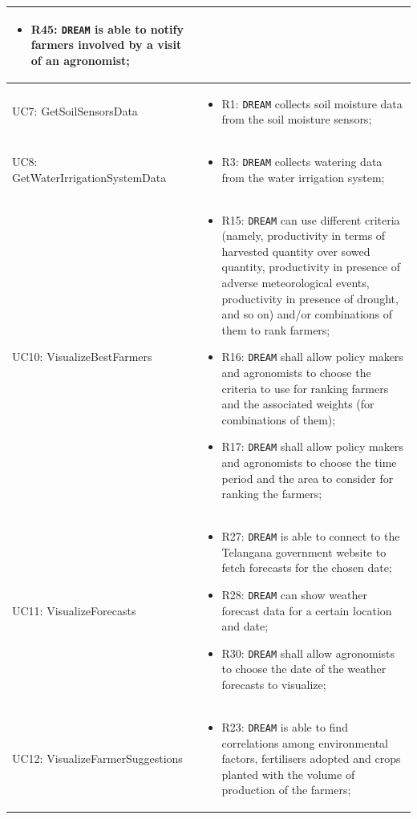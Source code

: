 \documentclass{article}
\begin{document}
\begin{longtable}[c]{|m{}|m{8cm}|}
\begin{itemize}
    \item R45: \verb|DREAM| is able to notify farmers involved by a visit of an agronomist;
\end{itemize}\\ \hline
UC7: GetSoilSensorsData &
\begin{itemize}
    \item R1: \verb|DREAM| collects soil moisture data from the soil moisture sensors;
\end{itemize} \\ \hline
UC8: GetWaterIrrigationSystemData &
\begin{itemize}
    \item R3: \verb|DREAM| collects watering data from the water irrigation system;
\end{itemize} \\ \hline
UC10: VisualizeBestFarmers &
\begin{itemize}
    \item R15: \verb|DREAM| can use different criteria (namely, productivity in terms of harvested quantity over sowed quantity, productivity in presence of adverse meteorological events, productivity in presence of drought, and so on) and/or combinations of them to rank farmers;
    
    \item R16: \verb|DREAM| shall allow policy makers and agronomists to choose the criteria to use for ranking farmers and the associated weights (for combinations of them);
    
    \item R17: \verb|DREAM| shall allow policy makers and agronomists to choose the time period and the area to consider for ranking the farmers;
\end{itemize} \\ \hline
UC11: VisualizeForecasts &
\begin{itemize}
    \item R27: \verb|DREAM| is able to connect to the Telangana government website to fetch forecasts for the chosen date;

    \item R28: \verb|DREAM| can show weather forecast data for a certain location and date;

    \item R30: \verb|DREAM| shall allow agronomists to choose the date of the weather forecasts to visualize; 
\end{itemize} \\ \hline
UC12: VisualizeFarmerSuggestions & 
\begin{itemize}
    \item R23: \verb|DREAM| is able to find correlations among environmental factors, fertilisers adopted and crops planted with the volume of production of the farmers;
 

\end{itemize}
\end{longtable}
\end{document}
